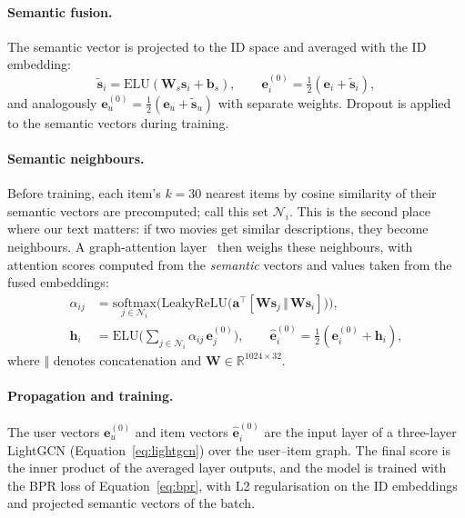 \documentclass[a4paper,11pt]{article}
\begin{document}
\paragraph{Semantic fusion.} The semantic vector is projected to the ID space and averaged with the ID embedding:
\begin{equation}
\label{eq:fusion}
\tilde{\mathbf{s}}_i = \mathrm{ELU}\!\left(\mathbf{W}_s\mathbf{s}_i+\mathbf{b}_s\right), \qquad
\mathbf{e}^{(0)}_i = \tfrac{1}{2}\left(\mathbf{e}_i+\tilde{\mathbf{s}}_i\right),
\end{equation}
and analogously $\mathbf{e}^{(0)}_u=\tfrac12(\mathbf{e}_u+\tilde{\mathbf{s}}_u)$ with separate weights. Dropout is applied to the semantic vectors during training.

\paragraph{Semantic neighbours.} Before training, each item's $k=30$ nearest items by cosine similarity of their semantic vectors are precomputed; call this set $\mathcal{N}_i$. This is the second place where our text matters: if two movies get similar descriptions, they become neighbours. A graph-attention layer~\cite{velickovic2018gat} then weighs these neighbours, with attention scores computed from the \emph{semantic} vectors and values taken from the fused embeddings:
\begin{align}
\alpha_{ij} &= \underset{j\in\mathcal{N}_i}{\mathrm{softmax}}\Big(\mathrm{LeakyReLU}\big(\mathbf{a}^\top[\mathbf{W}\mathbf{s}_j \,\Vert\, \mathbf{W}\mathbf{s}_i]\big)\Big), \label{eq:attention}\\
\mathbf{h}_i &= \mathrm{ELU}\Big(\sum_{j\in\mathcal{N}_i}\alpha_{ij}\,\mathbf{e}^{(0)}_j\Big), \qquad
\hat{\mathbf{e}}^{(0)}_i = \tfrac{1}{2}\left(\mathbf{e}^{(0)}_i+\mathbf{h}_i\right), \label{eq:neighbour}
\end{align}
where $\Vert$ denotes concatenation and $\mathbf{W}\in\mathbb{R}^{1024\times32}$.

\paragraph{Propagation and training.} The user vectors $\mathbf{e}^{(0)}_u$ and item vectors $\hat{\mathbf{e}}^{(0)}_i$ are the input layer of a three-layer LightGCN (Equation~\ref{eq:lightgcn}) over the user--item graph. The final score is the inner product of the averaged layer outputs, and the model is trained with the BPR loss of Equation~\ref{eq:bpr}, with L2 regularisation on the ID embeddings and projected semantic vectors of the batch.
\end{document}
